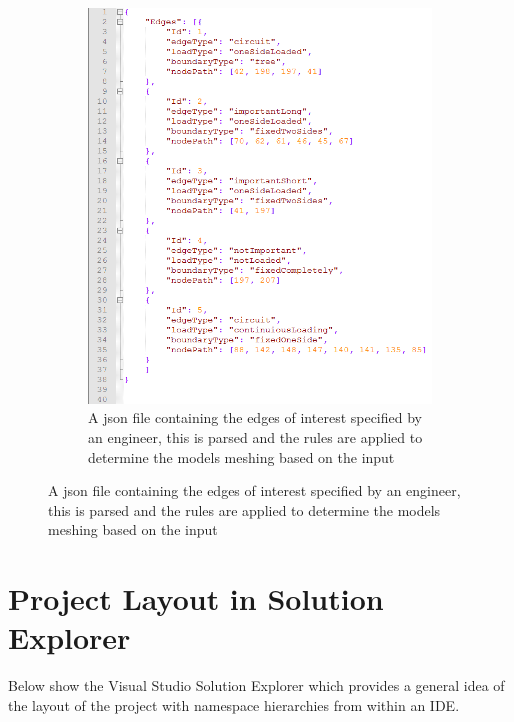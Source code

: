 \begin{figure}[!h]
\begin{subfigure}{.5\textwidth}
  \includegraphics[width=0.8\linewidth]{../Graphics/jsonEdgeFileLayout.png}
  \caption{A json file containing the edges of interest specified by an engineer, this is parsed and the rules are applied to determine the models meshing based on the input}
  \label{fig:sub2}
\end{subfigure}
\label{fig:test}
\end{figure}


\section{Project Layout in Solution Explorer}
Below show the Visual Studio Solution Explorer which provides a general idea of the layout of the project with namespace hierarchies from within an IDE.

